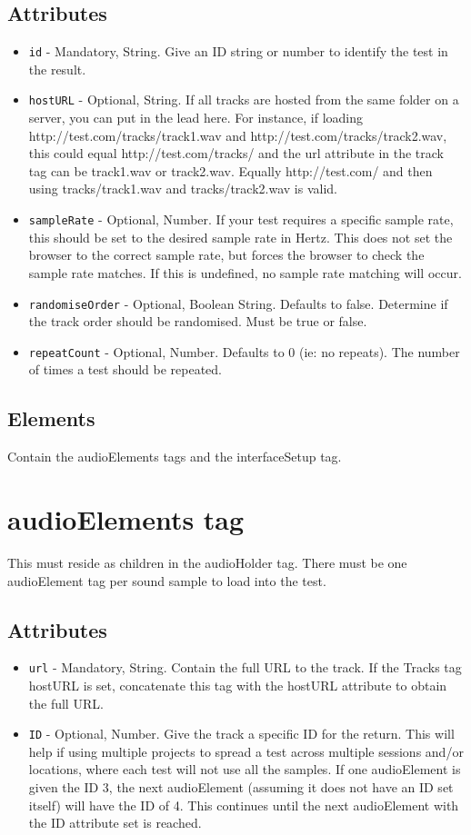 \documentclass{article}
\begin{document}
\subsection{Attributes}
\begin{itemize}
\item \texttt{id} - Mandatory, String. Give an ID string or number to identify the test in the result.
\item \texttt{hostURL} - Optional, String. If all tracks are hosted from the same folder on a server, you can put in the lead here. For instance, if loading http://test.com/tracks/track1.wav and http://test.com/tracks/track2.wav, this could equal http://test.com/tracks/ and the url attribute in the track tag can be track1.wav or track2.wav. Equally http://test.com/ and then using tracks/track1.wav and tracks/track2.wav is valid.
\item \texttt{sampleRate} - Optional, Number. If your test requires a specific sample rate, this should be set to the desired sample rate in Hertz. This does not set the browser to the correct sample rate, but forces the browser to check the sample rate matches. If this is undefined, no sample rate matching will occur.
\item \texttt{randomiseOrder} - Optional, Boolean String. Defaults to false. Determine if the track order should be randomised. Must be true or false.
\item \texttt{repeatCount} - Optional, Number. Defaults to 0 (ie: no repeats). The number of times a test should be repeated.
\end{itemize}

\subsection{Elements}
Contain the audioElements tags and the interfaceSetup tag.

\section{audioElements tag}

This must reside as children in the audioHolder tag. There must be one audioElement tag per sound sample to load into the test.

\subsection{Attributes}
\begin{itemize}
\item \texttt{url} - Mandatory, String. Contain the full URL to the track. If the Tracks tag hostURL is set, concatenate this tag with the hostURL attribute to obtain the full URL.
\item \texttt{ID} - Optional, Number. Give the track a specific ID for the return. This will help if using multiple projects to spread a test across multiple sessions and/or locations, where each test will not use all the samples. If one audioElement is given the ID 3, the next audioElement (assuming it does not have an ID set itself) will have the ID of 4. This continues until the next audioElement with the ID attribute set is reached.
\end{itemize}
\end{document}
